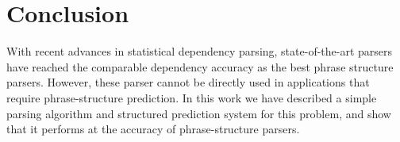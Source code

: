 \documentclass[11pt,letterpaper]{article}
\begin{document}







\begin{table}
  \centering

  \label{tab:speed}
  \caption{Experiments of parsing speed. (a) The speed of the parser on its own and with pruning. (b) The end-to-end speed of the parser when combined with different dependency parsers. }
\end{table}




\section{Conclusion}

With recent advances in statistical dependency parsing, state-of-the-art parsers
have reached the comparable  dependency accuracy as the best phrase structure parsers. However,
these parser cannot be directly used in applications that require phrase-structure prediction. In this work
we have described a simple parsing algorithm and structured prediction system for this problem, and show that it
performs at the accuracy of phrase-structure parsers.
\end{document}
